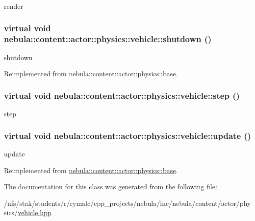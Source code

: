 render \hypertarget{classnebula_1_1content_1_1actor_1_1physics_1_1vehicle_a7754bdbff0f9be9487ca32a21d6e8d23}{
\subsubsection[{shutdown}]{\setlength{\rightskip}{0pt plus 5cm}virtual void nebula::content::actor::physics::vehicle::shutdown ()}}
\label{classnebula_1_1content_1_1actor_1_1physics_1_1vehicle_a7754bdbff0f9be9487ca32a21d6e8d23}


shutdown 

Reimplemented from \hyperlink{classnebula_1_1content_1_1actor_1_1physics_1_1base_a6de64e1ab1a4e3dd3274bfa722c7aed1}{nebula::content::actor::physics::base}.\hypertarget{classnebula_1_1content_1_1actor_1_1physics_1_1vehicle_aa91fc65d0e5ad3c55de9af1dc4fb3c59}{
\subsubsection[{step}]{\setlength{\rightskip}{0pt plus 5cm}virtual void nebula::content::actor::physics::vehicle::step ()}}
\label{classnebula_1_1content_1_1actor_1_1physics_1_1vehicle_aa91fc65d0e5ad3c55de9af1dc4fb3c59}


step \hypertarget{classnebula_1_1content_1_1actor_1_1physics_1_1vehicle_aefc63005bb3cd58e94f86b33ca07e17c}{
\subsubsection[{update}]{\setlength{\rightskip}{0pt plus 5cm}virtual void nebula::content::actor::physics::vehicle::update ()}}
\label{classnebula_1_1content_1_1actor_1_1physics_1_1vehicle_aefc63005bb3cd58e94f86b33ca07e17c}


update 

Reimplemented from \hyperlink{classnebula_1_1content_1_1actor_1_1physics_1_1base_a468da70c6f6c2520b458662ab97b76e5}{nebula::content::actor::physics::base}.

The documentation for this class was generated from the following file:\begin{DoxyCompactItemize}
\item 
/nfs/stak/students/r/rymalc/cpp\_\-projects/nebula/inc/nebula/content/actor/physics/\hyperlink{physics_2vehicle_8hpp}{vehicle.hpp}\end{DoxyCompactItemize}
